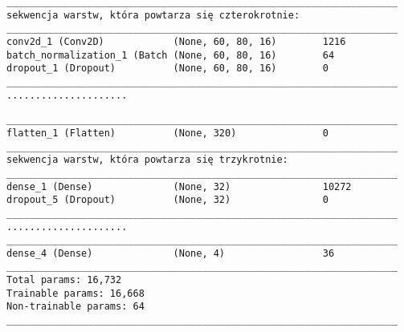 \newsavebox\myvq
\begin{lrbox}{\myvq}
\setlength{\myminipagewidth}{0.9\linewidth} %
\setlength{\myminipagecentering}{(\linewidth-\myminipagewidth)/2}
\noindent\hspace{\myminipagecentering}\begin{minipage}{\myminipagewidth}
\begin{verbatim}
____________________________________________________________________
sekwencja warstw, która powtarza się czterokrotnie:
____________________________________________________________________
conv2d_1 (Conv2D)            (None, 60, 80, 16)        1216      
batch_normalization_1 (Batch (None, 60, 80, 16)        64        
dropout_1 (Dropout)          (None, 60, 80, 16)        0    
____________________________________________________________________
.....................
\end{verbatim} 
\end{minipage}\end{lrbox}
\resizebox{0.75\textwidth}{!}{\usebox\myvq}

\newsavebox\myvqq
\begin{lrbox}{\myvqq}
\setlength{\myminipagewidth}{0.9\linewidth} %
\setlength{\myminipagecentering}{(\linewidth-\myminipagewidth)/2}
\noindent\hspace{\myminipagecentering}\begin{minipage}{\myminipagewidth}
\begin{verbatim}
____________________________________________________________________
flatten_1 (Flatten)          (None, 320)               0         
____________________________________________________________________
sekwencja warstw, która powtarza się trzykrotnie:
____________________________________________________________________
dense_1 (Dense)              (None, 32)                10272     
dropout_5 (Dropout)          (None, 32)                0         
____________________________________________________________________
.....................
____________________________________________________________________
dense_4 (Dense)              (None, 4)                 36        
____________________________________________________________________
Total params: 16,732
Trainable params: 16,668
Non-trainable params: 64
____________________________________________________________________
\end{verbatim} 
\end{minipage}\end{lrbox}
\resizebox{0.75\textwidth}{!}{\usebox\myvqq}

